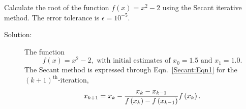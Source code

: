 \begin{list}{\bf Example :~}{}
   \item\label{Example:Roots:Secant} Calculate the root of the function $f(x) = x^{2}-2$ using the Secant iterative method. The error tolerance is $\epsilon=10^{-5}$.
      \begin{description}
        \item[Solution:] The function
          \begin{displaymath}
               f(x) = x^{2} - 2, \text{ with initial estimates of } x_{0}=1.5 \text{ and } x_{1}=1.0.
          \end{displaymath}
          The Secant method is expressed through Eqn.~\ref{Secant:Eqn1} for the $(k+1)^{\text{th}}$-iteration,
          \begin{displaymath}
            x_{k+1} = x_{k} - \displaystyle\frac{ x_{k} - x_{k-1} }{f\left(x_{k}\right) - f\left(x_{k-1}\right)} f\left(x_{k}\right).
         \end{displaymath}
\end{description}
\end{list}
